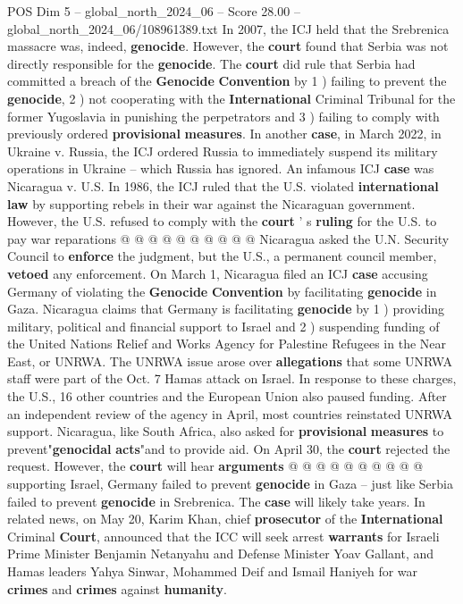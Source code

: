 \begin{textsample}{POS Dim 5 – global\_north\_2024\_06 – Score 28.00 – global\_north\_2024\_06/108961389.txt}
In 2007, the ICJ held that the Srebrenica massacre was, indeed, \textbf{genocide}.
However, the \textbf{court} found that Serbia was not directly responsible for the \textbf{genocide}.
The \textbf{court} did rule that Serbia had committed a breach of the \textbf{Genocide} \textbf{Convention} by 1 ) failing to prevent the \textbf{genocide}, 2 ) not cooperating with the \textbf{International} Criminal Tribunal for the former Yugoslavia in punishing the perpetrators and 3 ) failing to comply with previously ordered \textbf{provisional} \textbf{measures}.
In another \textbf{case}, in March 2022, in Ukraine v.
Russia, the ICJ ordered Russia to immediately suspend its military operations in Ukraine -- which Russia has ignored.
An infamous ICJ \textbf{case} was Nicaragua v.
U.S.
In 1986, the ICJ ruled that the U.S. violated \textbf{international} \textbf{law} by supporting rebels in their war against the Nicaraguan government.
However, the U.S. refused to comply with the \textbf{court} ' s \textbf{ruling} for the U.S. to pay war reparations @ @ @ @ @ @ @ @ @ @ Nicaragua asked the U.N.
Security Council to \textbf{enforce} the judgment, but the U.S., a permanent council member, \textbf{vetoed} any enforcement.
On March 1, Nicaragua filed an ICJ \textbf{case} accusing Germany of violating the \textbf{Genocide} \textbf{Convention} by facilitating \textbf{genocide} in Gaza.
Nicaragua claims that Germany is facilitating \textbf{genocide} by 1 ) providing military, political and financial support to Israel and 2 ) suspending funding of the United Nations Relief and Works Agency for Palestine Refugees in the Near East, or UNRWA.
The UNRWA issue arose over \textbf{allegations} that some UNRWA staff were part of the Oct. 7 Hamas attack on Israel.
In response to these charges, the U.S., 16 other countries and the European Union also paused funding.
After an independent review of the agency in April, most countries reinstated UNRWA support.
Nicaragua, like South Africa, also asked for \textbf{provisional} \textbf{measures} to prevent"\textbf{genocidal} \textbf{acts}"and to provide aid.
On April 30, the \textbf{court} rejected the request.
However, the \textbf{court} will hear \textbf{arguments} @ @ @ @ @ @ @ @ @ @ supporting Israel, Germany failed to prevent \textbf{genocide} in Gaza -- just like Serbia failed to prevent \textbf{genocide} in Srebrenica.
The \textbf{case} will likely take years.
In related news, on May 20, Karim Khan, chief \textbf{prosecutor} of the \textbf{International} Criminal \textbf{Court}, announced that the ICC will seek arrest \textbf{warrants} for Israeli Prime Minister Benjamin Netanyahu and Defense Minister Yoav Gallant, and Hamas leaders Yahya Sinwar, Mohammed Deif and Ismail Haniyeh for war \textbf{crimes} and \textbf{crimes} against \textbf{humanity}.

\end{textsample}
